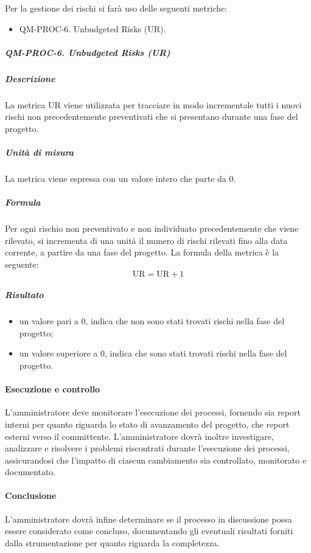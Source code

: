 			Per la gestione dei rischi si farà uso delle seguenti metriche:

			\begin{itemize}
				\item QM-PROC-6. Unbudgeted Risks (UR).
			\end{itemize}

			\subparagraph{QM-PROC-6. Unbudgeted Risks (UR)}

				\subparagraph{Descrizione}
				La metrica UR viene utilizzata per tracciare in modo incrementale tutti i nuovi rischi non precedentemente preventivati che si presentano durante una fase del progetto. 

				\subparagraph{Unità di misura}
				La metrica viene espressa con un valore intero che parte da 0. 

				\subparagraph{Formula}
				Per ogni rischio non preventivato e non individuato precedentemente che viene rilevato, si incrementa di una unità il numero di rischi rilevati fino alla data corrente, a partire da una fase del progetto.
				La formula della metrica è la seguente:
				\[
					\text{UR} = \text{UR} + 1
				\]
				
				\subparagraph{Risultato}
				\begin{itemize}
					\item un valore pari a 0, indica che non sono stati trovati rischi nella fase del progetto;
					\item un valore superiore a 0, indica che sono stati trovati rischi nella fase del progetto.
				\end{itemize}

		\paragraph{Esecuzione e controllo}
			L'amministratore deve monitorare l'esecuzione dei processi, fornendo sia report interni per quanto riguarda lo stato di avanzamento del progetto, che report esterni verso il committente.
			L'amministratore dovrà inoltre investigare, analizzare e risolvere i problemi riscontrati durante l'esecuzione dei processi, assicurandosi che l'impatto di ciascun cambiamento sia controllato, monitorato e documentato.

		\paragraph{Conclusione}
			L'amministratore dovrà infine determinare se il processo in discussione possa essere considerato come concluso, documentando gli eventuali risultati forniti dalla strumentazione per quanto riguarda la completezza.	 		

